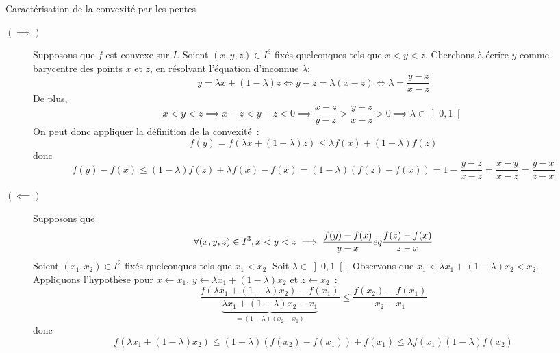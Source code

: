 \documentclass{article}
\begin{document}
\begin{question_kholle}{Caractérisation de la convexité par les pentes}
	\begin{description}
		\item[$(\implies )$] Supposons que $f$ est convexe sur $I$. Soient $(x,y,z)\in I^{3}$ fixés quelconques tels que $x<y<z$. Cherchons à écrire $y$ comme barycentre des points $x$ et $z$, en résolvant l’équation d’inconnue $\lambda$:
		      \[
			      y=\lambda x + (1-\lambda)z \iff y-z = \lambda(x-z) \iff  \lambda=\frac{y-z}{x-z}
		      \]
		      De plus,
		      \[
			      x<y<z \implies x-z<y-z<0 \implies \frac{x-z}{y-z}>\frac{y-z}{x-z}>0 \implies \lambda\in \left]0,1\right[
		      \]
		      On peut donc appliquer la définition de la convexité~:
		      \[
			      f(y)=f(\lambda x+(1-\lambda)z) \leq \lambda f(x)+(1-\lambda)f(z)
		      \]
		      donc
		      \[
			      f(y)-f(x)\leq (1-\lambda)f(z)+\lambda f(x) - f(x) = (1-\lambda)(f(z)-f(x)) = 1-\frac{y-z}{x-z}= \frac{x-y}{x-z} = \frac{y-x}{z-x}
		      \]

		\item [$(\impliedby)$] Supposons que
		      \[
			      \forall (x,y,z)\in I^{3}, x<y<z \implies  \frac{f(y)-f(x)}{y-x}\\eq \frac{f(z)-f(x)}{z-x}
		      \]
		      Soient $(x_{1}, x_{2})\in I^{2}$ fixés quelconques tels que $x_{1}<x_{2}$. Soit $\lambda\in\left]0,1\right[$. Observons que $x_{1}<\lambda x_{1}+(1-\lambda)x_{2}<x_{2}$.\\ Appliquons l’hypothèse pour $x\leftarrow x_{1}$, $y\leftarrow \lambda x_{1} + (1-\lambda)x_{2}$ et $z\leftarrow x_{2}$~:
		      \[
			      \frac{f(\lambda x_{1} + (1-\lambda)x_{2}) - f(x_{1})}{\underbrace{\lambda x_{1}+(1-\lambda)x_{2} - x_{1}}_{=(1-\lambda)(x_{2}-x_{1})}} \leq \frac{f(x_{2})-f(x_{1})}{x_{2}-x_{1}}
		      \]
		      donc
		      \[
			      f(\lambda x_{1}+(1-\lambda)x_{2}) \leq (1-\lambda)\left(f(x_{2})-f(x_{1})\right) + f(x_{1}) \leq \lambda f(x_{1})(1-\lambda)f(x_{2})
		      \]
	\end{description}
\end{question_kholle}
\end{document}
